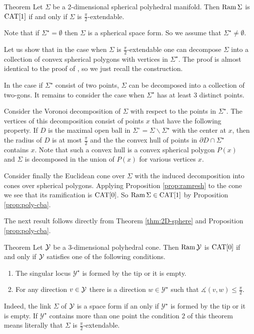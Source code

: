 \documentclass[oneside,a4paper]{article}
\def\Ram{\mathop{\rm Ram}\nolimits}
\begin{document}
\begin{thm}{Theorem}\label{thm:2D-sphere}
Let $\Sigma$ be a 2-dimensional spherical polyhedral manifold.
 Then $\Ram\Sigma$ is $\mathrm{CAT}[1]$ if and only if $\Sigma$ is $\frac{\pi}{2}$-extendable.
\end{thm}

Note that if $\Sigma^{{\star}}=\emptyset$ then
$\Sigma$ is a spherical space form.
So we assume that $\Sigma^{{\star}}\ne\emptyset$.

Let us show that in the case when $\Sigma$ is $\frac{\pi}{2}$-extendable one can
decompose $\Sigma$ into a collection of convex spherical
polygons with vertices in $\Sigma^{{\star}}$.
The proof is almost identical to the
proof of \cite[Proposition 3.1]{thurston},
so we just recall the construction.

In the case if $\Sigma^{{\star}}$ consist of two points,
$\Sigma$ can be decomposed into a collection of two-gons.
It remains to consider the case when $\Sigma^{{\star}}$ has at least 3 distinct points.

Consider the Voronoi decomposition of $\Sigma$ with respect to the points in $\Sigma^{{\star}}$.
The vertices of this decomposition
consist of points $x$ that have the following property.
If $D$ is the maximal open ball in $\Sigma^\circ=\Sigma\backslash \Sigma^{{\star}}$
with the center at $x$, then the radius of $D$ is at most $\tfrac\pi2$ and the  the convex hull of points in  $\partial D\cap \Sigma^{{\star}}$
contains $x$.
Note that such a convex hull is a convex spherical polygon $P(x)$ and $\Sigma$ is decomposed
in the union of $P(x)$ for various vertices $x$.

Consider finally the Euclidean cone over $\Sigma$ with the induced decomposition
into cones over spherical polygons. Applying Proposition \ref{prop:ramresh} to the cone we
see that its ramification is $\mathrm{CAT}[0]$. So $\Ram\Sigma\in \CAT[1]$ by Proposition \ref{prop:poly-cba}.
\qeds

The next result follows directly from Theorem \ref{thm:2D-sphere} and Proposition \ref{prop:poly-cba}.

\begin{thm}{Theorem}\label{3cone}
Let $\mathcal{Y}$ be a 3-dimensional polyhedral cone.
Then $\Ram \spc{Y}$ is $\mathrm{CAT}[0]$
if and only if
$\mathcal{Y}$ satisfies one of the following conditions.
\begin{enumerate}
\item The singular locus $\mathcal{Y}^\star$ is formed by the tip or it is empty.
\item For any direction $v\in\mathcal{Y}$ there is a direction $w\in\mathcal{Y}^\star$ such that $\measuredangle(v,w)\le \tfrac\pi2$.
\end{enumerate}
\end{thm}
Indeed, the link $\Sigma$ of $\mathcal{Y}$ is a space form if an only if
$\mathcal{Y}^\star$ is formed by the tip or it is empty.
If $\mathcal{Y}^\star$ contains more than one point
the condition $2$ of this theorem means literally that $\Sigma$ is $\frac{\pi}{2}$-extendable.
\end{document}

